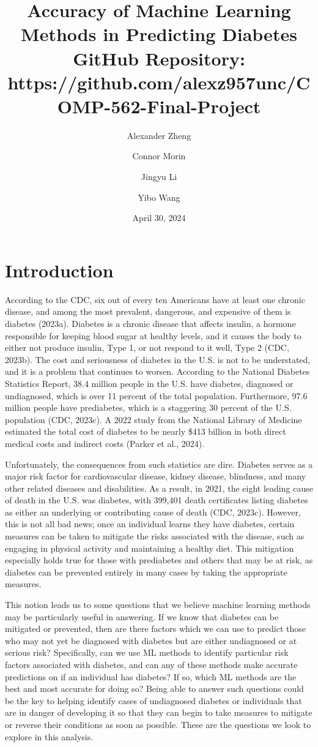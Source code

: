 \documentclass[12pt]{article}
\title{%
  Accuracy of Machine Learning Methods in Predicting Diabetes \\
  \vspace{5mm}
  \large GitHub Repository: https://github.com/alexz957unc/COMP-562-Final-Project}
\author{Alexander Zheng\and Connor Morin\and Jingyu Li\and Yibo Wang}
\date{April 30, 2024}
\begin{document}
\maketitle

\section{Introduction}
According to the CDC, six out of every ten Americans have at least one chronic disease, and among the most prevalent, dangerous, and expensive of them is diabetes (2023a). Diabetes is a chronic disease that affects insulin, a hormone responsible for keeping blood sugar at healthy levels, and it causes the body to either not produce insulin, Type 1, or not respond to it well, Type 2 (CDC, 2023b). The cost and seriousness of diabetes in the U.S. is not to be understated, and it is a problem that continues to worsen. According to the National Diabetes Statistics Report, 38.4 million people in the U.S. have diabetes, diagnosed or undiagnosed, which is over 11 percent of the total population. Furthermore, 97.6 million people have prediabetes, which is a staggering 30 percent of the U.S. population (CDC, 2023c). A 2022 study from the National Library of Medicine estimated the total cost of diabetes to be nearly \$413 billion in both direct medical costs and indirect costs (Parker et al., 2024). 

Unfortunately, the consequences from such statistics are dire. Diabetes serves as a major risk factor for cardiovascular disease, kidney disease, blindness, and many other related diseases and disabilities. As a result, in 2021, the eight leading cause of death in the U.S. was diabetes, with 399,401 death certificates listing diabetes as either an underlying or contributing cause of death (CDC, 2023c). However, this is not all bad news; once an individual learns they have diabetes, certain measures can be taken to mitigate the risks associated with the disease, such as engaging in physical activity and maintaining a healthy diet. This mitigation especially holds true for those with prediabetes and others that may be at risk, as diabetes can be prevented entirely in many cases by taking the appropriate measures.

This notion leads us to some questions that we believe machine learning methods may be particularly useful in answering. If we know that diabetes can be mitigated or prevented, then are there factors which we can use to predict those who may not yet be diagnosed with diabetes but are either undiagnosed or at serious risk? Specifically, can we use ML methods to identify particular risk factors associated with diabetes, and can any of these methods make accurate predictions on if an individual has diabetes? If so, which ML methods are the best and most accurate for doing so? Being able to answer such questions could be the key to helping identify cases of undiagnosed diabetes or individuals that are in danger of developing it so that they can begin to take measures to mitigate or reverse their conditions as soon as possible. These are the questions we look to explore in this analysis.
\end{document}
